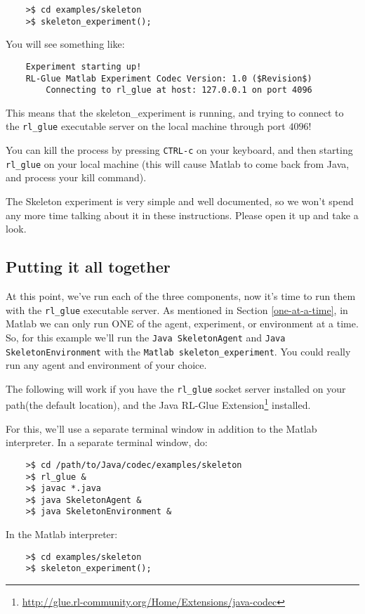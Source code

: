 \documentclass[11pt]{article}
\begin{document}
\begin{verbatim}
	>$ cd examples/skeleton
	>$ skeleton_experiment();
\end{verbatim}

You will see something like:
\begin{verbatim}
	Experiment starting up!
	RL-Glue Matlab Experiment Codec Version: 1.0 ($Revision$)
	    Connecting to rl_glue at host: 127.0.0.1 on port 4096
\end{verbatim}

This means that the skeleton\_experiment is running, and trying to connect to the \texttt{rl\_glue} executable server on the local machine through port $4096$!  

You can kill the process by pressing \texttt{CTRL-c} on your keyboard, and then starting  \texttt{rl\_glue} on your local machine (this will cause Matlab to come back from Java, and 
process your kill command).

The Skeleton experiment is very simple and well documented, so we won't spend any more time talking about it in these instructions.
Please open it up and take a look.

\subsection{Putting it all together}
At this point, we've run each of the three components, now it's time to run them with the \texttt{rl\_glue} executable server.  As mentioned in Section \ref{one-at-a-time}, in Matlab we can 
only run ONE of the agent, experiment, or environment at a time.  So, for this example we'll run the \texttt{Java SkeletonAgent} and \texttt{Java SkeletonEnvironment} with the \texttt{Matlab skeleton\_experiment}.  You could really run any agent and environment of your choice.

The following will work if you have the \texttt{rl\_glue} socket server installed on your path(the default location), and the Java RL-Glue Extension\footnote{\url{http://glue.rl-community.org/Home/Extensions/java-codec}} installed.

For this, we'll use a separate terminal window in addition to the Matlab interpreter.  In a separate terminal window, do:
\begin{verbatim}
	>$ cd /path/to/Java/codec/examples/skeleton
	>$ rl_glue &
	>$ javac *.java
	>$ java SkeletonAgent &
	>$ java SkeletonEnvironment &
\end{verbatim}

In the Matlab interpreter:
\begin{verbatim}
	>$ cd examples/skeleton
	>$ skeleton_experiment();
\end{verbatim}
\end{document}
